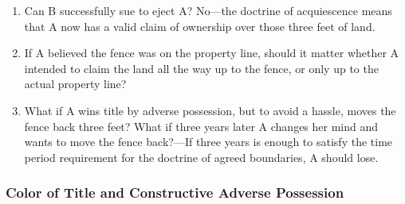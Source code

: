 \begin{enumerate}
\begin{enumerate}
        \item Can B successfully sue to eject A? No---the doctrine of 
        acquiescence means that A now has a valid claim of ownership over 
        those three feet of land.
        \item If A believed the fence was on the property line, should it 
        matter whether A intended to claim the land all the way up to the 
        fence, or only up to the actual property line?
        \item What if A wins title by adverse possession, but to avoid a 
        hassle, moves the fence back three feet? What if three years later A 
        changes her mind and wants to move the fence back?---If three years is 
        enough to satisfy the time period requirement for the doctrine of 
        agreed boundaries, A should lose.
    \end{enumerate}
\end{enumerate}

\subsubsection{Color of Title and Constructive Adverse Possession}

